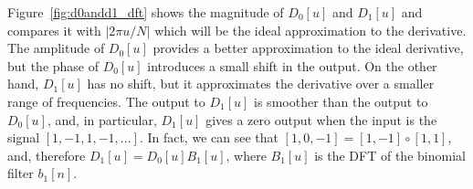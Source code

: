 Figure~\ref{fig:d0andd1_dft} shows the magnitude of $D_0\left[u \right]$ and $D_1\left[u \right]$ and compares it with $\left| 2 \pi u/N \right|$ which will be the ideal approximation to the derivative. The amplitude of $D_0\left[u \right]$ provides a better approximation to the ideal derivative, but the phase of $D_0\left[u \right]$ introduces a small shift in the output. On the other hand, $D_1\left[u \right]$ has no shift, but it approximates the derivative over a smaller range of frequencies. The output to $D_1\left[u \right]$ is smoother than the output to $D_0\left[u \right]$, and, in particular, $D_1\left[u \right]$ gives a zero output when the input is the signal $\left[ 1, -1, 1, -1, ... \right]$. In fact, we can see that $\left[1,0,-1\right] = \left[1,-1\right] \circ \left[1,1\right]$, and, therefore $D_1\left[u \right] = D_0\left[u \right] B_1\left[u \right]$, where $B_1\left[u \right]$ is the DFT of the binomial filter $b_1 \left[n \right]$.

